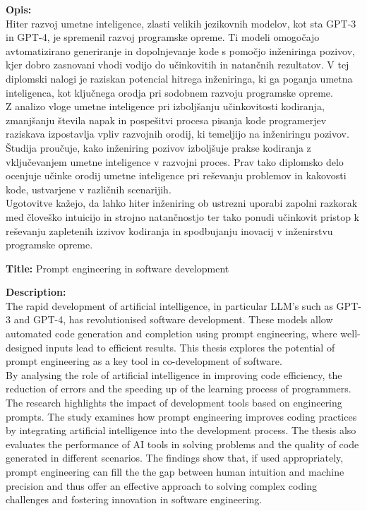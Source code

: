 \documentclass[a4paper,12pt,openright]{book}
\newcommand{\ttitleEn}{Prompt engineering in software development}
\begin{document}
\bigskip
\noindent\textbf{Opis:}\\
Hiter razvoj umetne inteligence, zlasti velikih jezikovnih modelov, kot sta GPT-3 in GPT-4, je spremenil razvoj programske opreme. Ti modeli omogočajo avtomatizirano generiranje in dopolnjevanje kode s pomočjo inženiringa pozivov, kjer dobro zasnovani vhodi vodijo do učinkovitih in natančnih rezultatov. V tej diplomski nalogi je raziskan potencial hitrega inženiringa, ki ga poganja umetna inteligenca, kot ključnega orodja pri sodobnem razvoju programske opreme. \\
Z analizo vloge umetne inteligence pri izboljšanju učinkovitosti kodiranja, zmanjšanju števila napak in pospešitvi procesa pisanja kode programerjev raziskava izpostavlja vpliv razvojnih orodij, ki temeljijo na inženiringu pozivov. Študija proučuje, kako inženiring pozivov izboljšuje prakse kodiranja z vključevanjem umetne inteligence v razvojni proces. Prav tako diplomsko delo ocenjuje učinke orodij umetne inteligence pri reševanju problemov in kakovosti kode, ustvarjene v različnih scenarijih. \\
Ugotovitve kažejo, da lahko hiter inženiring ob ustrezni uporabi zapolni razkorak med človeško intuicijo in strojno natančnostjo ter tako ponudi učinkovit pristop k reševanju zapletenih izzivov kodiranja in spodbujanju inovacij v inženirstvu programske opreme.

\bigskip
\pagebreak
\noindent\textbf{Title:} \ttitleEn

\bigskip
\noindent\textbf{Description:}\\
The rapid development of artificial intelligence, in particular LLM's such as
GPT-3 and GPT-4, has revolutionised software development. These models
allow automated code generation and completion using prompt engineering, where well-designed inputs lead to efficient results. This thesis explores the potential of prompt engineering as a key tool in co-development of software. \\
By analysing the role of artificial intelligence in improving code efficiency,
the reduction of errors and the speeding up of the learning process of programmers.
The research highlights the impact of development tools based on
engineering prompts. The study examines how prompt engineering improves
coding practices by integrating artificial intelligence into the development process.
The thesis also evaluates the performance of AI tools in solving
problems and the quality of code generated in different scenarios.
The findings show that, if used appropriately, prompt engineering can fill the
the gap between human intuition and machine precision and thus offer an effective
approach to solving complex coding challenges and fostering innovation in
software engineering.
\bigskip
\end{document}
